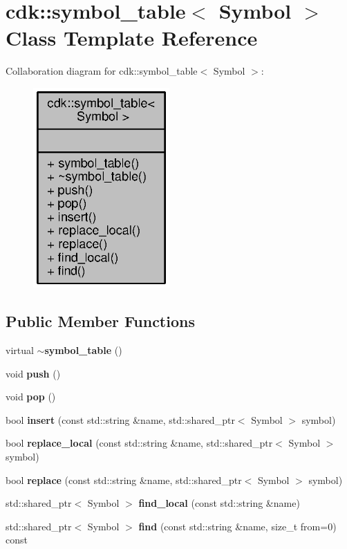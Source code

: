 \section{cdk\+:\+:symbol\+\_\+table$<$ Symbol $>$ Class Template Reference}
\label{classcdk_1_1symbol__table}


Collaboration diagram for cdk\+:\+:symbol\+\_\+table$<$ Symbol $>$\+:
\nopagebreak
\begin{figure}[H]
\begin{center}
\leavevmode
\includegraphics[width=148pt]{classcdk_1_1symbol__table__coll__graph}
\end{center}
\end{figure}
\subsection*{Public Member Functions}
\begin{DoxyCompactItemize}
\item 
virtual {\bf $\sim$symbol\+\_\+table} ()
\item 
void {\bf push} ()
\item 
void {\bf pop} ()
\item 
bool {\bf insert} (const std\+::string \&name, std\+::shared\+\_\+ptr$<$ Symbol $>$ symbol)
\item 
bool {\bf replace\+\_\+local} (const std\+::string \&name, std\+::shared\+\_\+ptr$<$ Symbol $>$ symbol)
\item 
bool {\bf replace} (const std\+::string \&name, std\+::shared\+\_\+ptr$<$ Symbol $>$ symbol)
\item 
std\+::shared\+\_\+ptr$<$ Symbol $>$ {\bf find\+\_\+local} (const std\+::string \&name)
\item 
std\+::shared\+\_\+ptr$<$ Symbol $>$ {\bf find} (const std\+::string \&name, size\+\_\+t from=0) const 
\end{DoxyCompactItemize}



